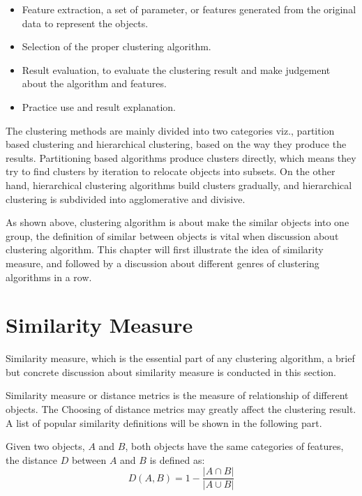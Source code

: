 \documentclass[utf8,english]{gradu3}
\begin{document}
\begin{itemize}
	\item Feature extraction, a set of parameter, or features generated from the original data to represent the objects.
	\item Selection of the proper clustering algorithm.
	\item Result evaluation, to evaluate the clustering result and make judgement about the algorithm and features.
	\item Practice use and result explanation.
\end{itemize}

The clustering methods are mainly divided into two categories viz., partition based clustering and hierarchical clustering, based on the way they produce the results. Partitioning based algorithms produce clusters directly, which means they try to find clusters by iteration to relocate objects into subsets. On the other hand, hierarchical clustering algorithms build clusters gradually, and hierarchical clustering is subdivided into agglomerative and divisive.

As shown above, clustering algorithm is about make the similar objects into one group, the definition of similar between objects is vital when discussion about clustering algorithm. This chapter will first illustrate the idea of similarity measure, and followed by a discussion about different genres of clustering algorithms in a row.

\section{Similarity Measure}

Similarity measure, which is the essential part of any clustering algorithm, a brief but concrete discussion about similarity measure is conducted in this section.

Similarity measure or distance metrics is the measure of relationship of different objects. The Choosing of distance metrics may greatly affect the clustering result. A list of popular similarity definitions will be shown in the following part.

\begin{definition}
	\label{def:jaccard_distance}
	Given two objects, $A$ and $B$, both objects have the same categories of features, the distance $D$ between $A$ and $B$ is defined as:
	\[
	D\left(A,B\right) = 1 - 
	\frac{
		\lvert A \cap B \lvert
	}{
		\lvert A \cup B \lvert
	}
\]
\end{definition}
\end{document}
